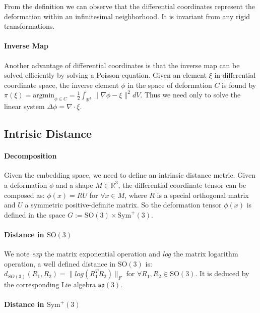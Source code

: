 \documentclass[11pt]{article}
\begin{document}
From the definition we can observe that the differential coordinates represent the deformation within an infinitesimal neighborhood.
It is invariant from any rigid transformations. 

\paragraph{Inverse Map}

Another advantage of differential coordinates is that the inverse map can be solved efficiently by solving a Poisson equation.
Given an element $\xi$ in differential coordinate space, the inverse element $\phi$ in the space of deformation $C$ is found by $\pi (\xi) = \mbox{argmin}_{\phi \in C} = \frac{1}{2} \int_{\mathbb{R}^3} \|  \nabla\phi -  \xi \|^2 dV$.
Thus we need only to solve the linear system $\Delta \phi = \nabla \cdot \xi$.

\subsection{Intrisic Distance}

\paragraph{Decomposition}

Given the embedding space, we need to define an intrinsic distance metric. Given a deformation $\phi$ and a shape $M \in \mathbb{R}^3$, the differential coordinate tensor can be composed as: $\phi(x) = RU$ for $\forall x \in M$, where $R$ is a special orthogonal matrix and $U$ a symmetric positive-definite matrix.
So the deformation tensor $\phi(x)$ is defined in the space $G:= \mbox{SO}(3) \times \mbox{Sym}^+ (3)$. 

\paragraph{Distance in $\mbox{SO}(3)$}

We note \textit{exp} the matrix exponential operation and \textit{log} the matrix logarithm operation, a well defined distance in $\mbox{SO}(3)$ is: $d_{SO(3)}(R_1, R_2) = \|log (R_1^T R_2)\|_F$ for $\forall R_1, R_2 \in \mbox{SO}(3)$.
It is deduced by the corresponding Lie algebra $\mathfrak{so} (3)$.

\paragraph{Distance in $\mbox{Sym}^+ (3)$}
\end{document}
